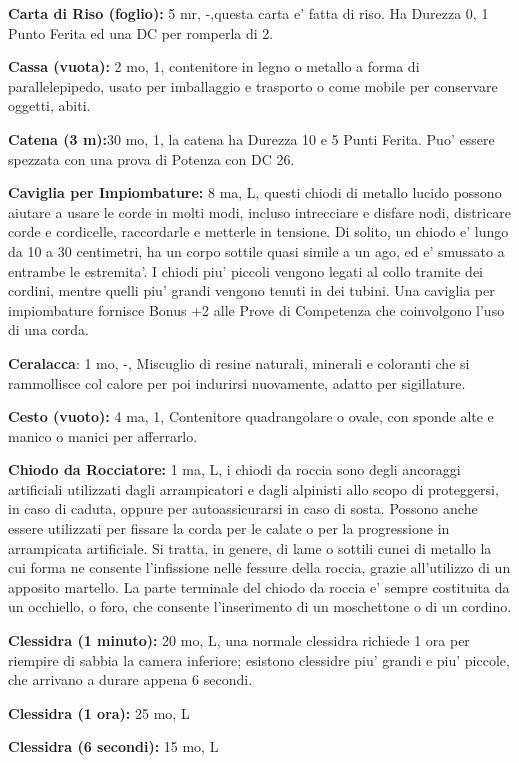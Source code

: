\documentclass[a4paper,11pt,twoside,openany]{book}
\begin{document}
{\textbf{Carta di Riso (foglio):} 5 mr, -,questa carta e' fatta di riso. Ha Durezza 0, 1 Punto Ferita ed una DC per romperla di 2.

\textbf{Cassa (vuota):} 2 mo, 1, contenitore in legno o metallo a forma di parallelepipedo, usato per imballaggio e trasporto o come mobile per conservare oggetti, abiti. 

\textbf{Catena (3 m):}30 mo, 1, la catena ha Durezza 10 e 5 Punti Ferita. Puo' essere spezzata con una prova di Potenza con DC 26.

\textbf{Caviglia per Impiombature:} 8 ma, L, questi chiodi di metallo lucido possono aiutare a usare le corde in molti modi, incluso intrecciare e disfare nodi, districare corde e cordicelle, raccordarle e metterle in tensione. Di solito, un chiodo e' lungo da 10 a 30 centimetri, ha un corpo sottile quasi simile a un ago, ed e' smussato a entrambe le estremita'. I chiodi piu' piccoli vengono legati al collo tramite dei cordini, mentre quelli piu' grandi vengono tenuti in dei tubini. Una caviglia per impiombature fornisce Bonus +2 alle Prove di Competenza che coinvolgono l'uso di una corda. 

\textbf{Ceralacca}: 1 mo, -, Miscuglio di resine naturali, minerali e coloranti che si rammollisce col calore per poi indurirsi nuovamente, adatto per sigillature.

\textbf{Cesto (vuoto):} 4 ma, 1, Contenitore quadrangolare o ovale, con sponde alte e manico o manici per afferrarlo.

\textbf{Chiodo da Rocciatore:} 1 ma, L, i chiodi da roccia sono degli ancoraggi artificiali utilizzati dagli arrampicatori e dagli alpinisti allo scopo di proteggersi, in caso di caduta, oppure per autoassicurarsi in caso di sosta. Possono anche essere utilizzati per fissare la corda per le calate o per la progressione in arrampicata artificiale. Si tratta, in genere, di lame o sottili cunei di metallo la cui forma ne consente l'infissione nelle fessure della roccia, grazie all'utilizzo di un apposito martello. La parte terminale del chiodo da roccia e' sempre costituita da un occhiello, o foro, che consente l'inserimento di un moschettone o di un cordino.

\textbf{Clessidra (1 minuto):} 20 mo, L, una normale clessidra richiede 1 ora per riempire di sabbia la camera inferiore; esistono clessidre piu' grandi e piu' piccole, che arrivano a durare appena 6
secondi.

\textbf{Clessidra (1 ora):} 25 mo, L

\textbf{Clessidra (6 secondi):} 15 mo, L

}
\end{document}
